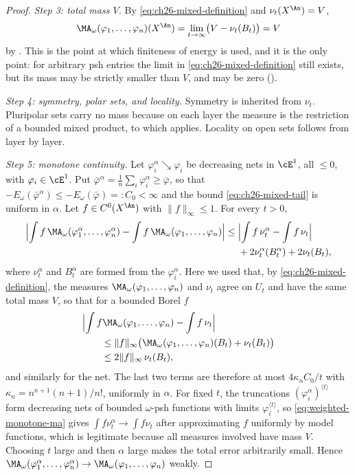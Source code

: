 \begin{proof}
\emph{Step 3: total mass \(V\).}  By \eqref{eq:ch26-mixed-definition} and
\(\nu_t(X^{\An})=V\),
\[
 \MA_\omega(\varphi_1,\ldots,\varphi_n)(X^{\An})
 =\lim_{t\to\infty}\bigl(V-\nu_t(B_t)\bigr)=V
\]
by .  This is the point at which finiteness of
energy is used, and it is the only point: for arbitrary psh entries the limit
in \eqref{eq:ch26-mixed-definition} still exists, but its mass may be
strictly smaller than \(V\), and may be zero
().

\emph{Step 4: symmetry, polar sets, and locality.}  Symmetry is inherited
from \(\nu_t\).  Pluripolar sets carry no mass because on each layer the
measure is the restriction of a bounded mixed product, to which
 applies.  Locality on open sets follows
from  layer by layer.

\emph{Step 5: monotone continuity.}  Let \(\varphi_i^\alpha\searrow\varphi_i\)
be decreasing nets in \(\cE^1\), all \(\leq0\), with
\(\varphi_i\in\cE^1\).  Put
\(\bar\varphi^\alpha=\frac1n\sum_i\varphi_i^\alpha\geq\bar\varphi\), so that
\(-E_\omega(\bar\varphi^\alpha)\leq-E_\omega(\bar\varphi)=:C_0<\infty\) and
the bound \eqref{eq:ch26-mixed-tail} is uniform in \(\alpha\).  Let
\(f\in C^0(X^{\An})\) with \(\lVert f\rVert_\infty\leq1\).  For every
\(t>0\),
\[
\begin{split}
 \Bigl|\int f\,\MA_\omega(\varphi_1^\alpha,\ldots,\varphi_n^\alpha)
      -\int f\,\MA_\omega(\varphi_1,\ldots,\varphi_n)\Bigr|
 \leq{}&\Bigl|\int f\,\nu_t^\alpha-\int f\,\nu_t\Bigr|\\
 &+2\nu_t^\alpha(B_t^\alpha)+2\nu_t(B_t),
\end{split}
\]
where \(\nu^\alpha_t\) and \(B_t^\alpha\) are formed from the
\(\varphi_i^\alpha\).  Here we used that, by
\eqref{eq:ch26-mixed-definition}, the measures
\(\MA_\omega(\varphi_1,\ldots,\varphi_n)\) and \(\nu_t\) agree on \(U_t\) and
have the same total mass \(V\), so that for a bounded Borel \(f\)
\[
 \begin{aligned}
 &\Bigl|\int f\MA_\omega(\varphi_1,\ldots,\varphi_n)-\int f\,\nu_t\Bigr|\\
 &\qquad\leq\lVert f\rVert_\infty
   \bigl(\MA_\omega(\varphi_1,\ldots,\varphi_n)(B_t)+\nu_t(B_t)\bigr)\\
 &\qquad\leq2\lVert f\rVert_\infty\,\nu_t(B_t),
 \end{aligned}
\]
and similarly for the net.  The last two terms are therefore at most
\(4\kappa_nC_0/t\) with
\(\kappa_n=n^{n+1}(n+1)/n!\), uniformly in \(\alpha\).  For fixed \(t\), the
truncations \((\varphi_i^\alpha)^{\langle t\rangle}\) form decreasing nets of
bounded \(\omega\)-psh functions with limits
\(\varphi_i^{\langle t\rangle}\), so
\eqref{eq:weighted-monotone-ma} gives \(\int f\nu^\alpha_t\to\int f\nu_t\)
after approximating \(f\) uniformly by model functions, which is legitimate
because all measures involved have mass \(V\).  Choosing \(t\) large and then
\(\alpha\) large makes the total error arbitrarily small.  Hence
\(\MA_\omega(\varphi_1^\alpha,\ldots,\varphi_n^\alpha)\to
\MA_\omega(\varphi_1,\ldots,\varphi_n)\) weakly.


\end{proof}
